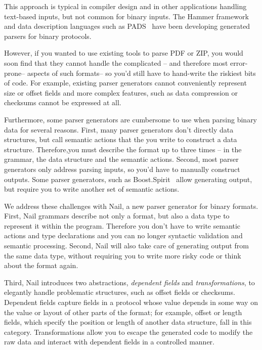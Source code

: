 This approach is typical in compiler design and in other applications handling text-based inputs, but not
common for binary inputs. The Hammer framework~\cite{hammer-parser} and data description languages such as
PADS~\cite{Fisher:2005:PDL:1064978.1065046} have been developing generated parsers for binary protocols.

However, if you wanted to use existing tools to parse PDF
or ZIP, you would soon find that they cannot handle the complicated -- and therefore most
error-prone-- aspects of such formats-- so you'd still have to
hand-write the riskiest bits of code. For example, existing parser generators cannot conveniently represent size or offset fields and more complex features, such as data compression or checksums cannot be expressed at all.

Furthermore, some parser generators are cumbersome to use when parsing binary data for several
reasons. First, many parser generators don't directly data structures, but call semantic actions
that the you write to construct a data structure. Therefore,you must
describe the format up to three times -- in the grammar, the data structure and the semantic
actions. Second, most parser generators only address parsing inputs, so you'd have to manually
construct outputs. Some parser generators, such as 
Boost.Spirit~\cite{boost-spirit} allow generating output, but require you to write another set of semantic actions.


We address these challenges with Nail, a new parser generator for binary formats.
First, Nail grammars describe not only a format, but also a data type to represent it within the program.
Therefore you don't have to write semantic actions and type declarations and you can no longer syntactic validation and semantic processing.
Second, Nail will also take care of generating output from the same data type, without requiring you
to write more risky code or think about the format again.

Third,  Nail introduces two abstractions, \emph{dependent fields} and
\emph{transformations}, to elegantly handle problematic structures,
such as offset fields or checksums.  Dependent fields capture fields
in a protocol whose value depends in some way on the value or layout
of other parts of the format; for example, offset or length fields,
which specify the position or length of another data structure, fall
in this category.  Transformations allow you to escape the
generated code to modify the raw data and interact with dependent fields
in a controlled manner.

